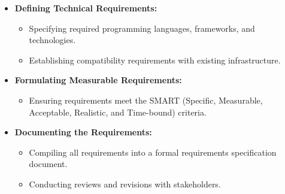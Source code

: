 \documentclass{article}
\begin{document}
\begin{itemize}[leftmargin=*, label={}]
\begin{itemize}
            \item \textbf{Defining Technical Requirements:}
                \begin{itemize}
                    \item Specifying required programming languages, frameworks, and technologies.
                    \item Establishing compatibility requirements with existing infrastructure.
                \end{itemize}
            \item \textbf{Formulating Measurable Requirements:}
                \begin{itemize}
                    \item Ensuring requirements meet the SMART (Specific, Measurable, Acceptable, Realistic, and Time-bound) criteria.
                \end{itemize}
            \item \textbf{Documenting the Requirements:}
                \begin{itemize}
                    \item Compiling all requirements into a formal requirements specification document.
                    \item Conducting reviews and revisions with stakeholders.
                \end{itemize}
        \end{itemize}


\end{itemize}
\end{document}

